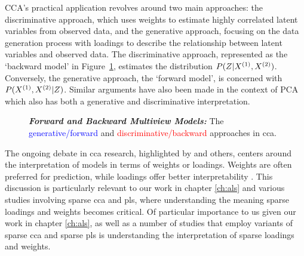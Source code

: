 CCA's practical application revolves around two main approaches: the discriminative approach, which uses weights to estimate highly correlated latent variables from observed data, and the generative approach, focusing on the data generation process with loadings to describe the relationship between latent variables and observed data.
The discriminative approach, represented as the `backward model' in Figure~\ref{fig:forward-backward-models}, estimates the distribution $P(Z|X^{(1)},X^{(2)})$.
Conversely, the generative approach, the `forward model', is concerned with $P(X^{(1)},X^{(2)}|Z)$.
Similar arguments have also been made in the context of PCA \citep{park2023critical} which also has both a generative \citep{tipping1999probabilistic} and discriminative \citep{hotelling1933analysis} interpretation.

\begin{figure}
    \centering
    \caption[Forward and Backward Multiview Models]{\textit{\textbf{Forward and Backward Multiview Models:}} The \textcolor{blue}{generative/forward} and \textcolor{red}{discriminative/backward} approaches in \acrshort{cca}.}\label{fig:forward-backward-models}
\end{figure}

The ongoing debate in \acrshort{cca} research, highlighted by \citet{gu2018simultaneous} and others, centers around the interpretation of models in terms of weights or loadings.
Weights are often preferred for prediction, while loadings offer better interpretability \citep{liu2022improved}.
This discussion is particularly relevant to our work in chapter \ref{ch:als} and various studies involving sparse \acrshort{cca} and \acrshort{pls}, where understanding the meaning sparse loadings and weights becomes critical.
Of particular importance to us given our work in chapter \ref{ch:als}, as well as a number of studies that employ variants of sparse \acrshort{cca} and sparse \acrshort{pls} is understanding the interpretation of sparse loadings and weights.

